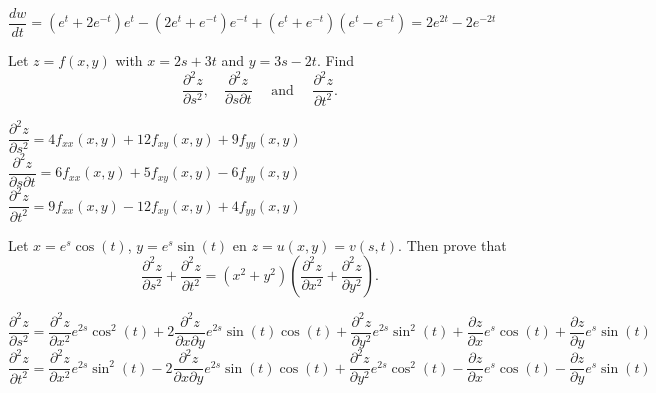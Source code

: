 \begin{Answer}
    $\dfrac{dw}{dt} = (e^t+2e^{-t})e^t - (2e^t+e^{-t})e^{-t} + (e^t+e^{-t})(e^t-e^{-t}) = 2e^{2t}-2e^{-2t}$
\end{Answer}
\fi

\ifanalysis\begin{Exercise}[difficulty = 2]\fi\ifcalculus\begin{Exercise}[difficulty = 3]\fi Let $z = f(x,y)$ with $x=2s+3t$ and $y=3s-2t$. Find $$\dfrac{\partial^2 z}{\partial s^2}, \quad \dfrac{\partial^2 z}{\partial s \partial t} \quad \text{ and } \quad \dfrac{\partial^2 z}{\partial t^2}.$$
\ifanalysis\end{Exercise}\fi\ifcalculus\end{Exercise}\fi

\begin{Answer}

    $\dfrac{\partial^2 z}{ \partial s^2}  = 4 f_{xx}(x,y) + 12 f_{xy}(x,y) + 9 f_{yy}(x,y) $
    \\ $\dfrac{\partial^2 z}{ \partial s \partial t} = 6 f_{xx}(x,y) + 5 f_{xy}(x,y) -6 f_{yy}(x,y)$ 
    \\ $\dfrac{\partial^2 z}{ \partial t^2}  = 9 f_{xx}(x,y) - 12 f_{xy}(x,y) + 4 f_{yy}(x,y) $
\end{Answer}

\ifanalysis
\begin{Exercise}[difficulty = 3]
Let $x=e^s \cos (t)$, $y=e^s \sin (t)$ en $z=u(x,y)=v(s,t)$. Then prove that
\[\dfrac{\partial^2 z}{\partial s^2} + \dfrac{\partial^2 z}{\partial t^2} = (x^2 + y^2) \left(  \dfrac{\partial^2 z}{\partial x^2} + \dfrac{\partial^2 z}{\partial y^2} \right). \]
\end{Exercise}

\begin{Answer}

    $\dfrac{\partial^2 z}{ \partial s^2}  = \dfrac{\partial^2 z}{ \partial x^2} e^{2s} \cos^2 (t) + 2 \dfrac{\partial^2 z}{ \partial x \partial y} e^{2s} \sin (t) \cos (t)+ \dfrac{\partial^2 z}{ \partial y^2} e^{2s} \sin^2 (t) + \dfrac{\partial z}{ \partial x} e^{s} \cos (t) + \dfrac{\partial z}{ \partial y} e^{s} \sin (t)$ \\[0.2cm]
     $\dfrac{\partial^2 z}{ \partial t^2}  = \dfrac{\partial^2 z}{ \partial x^2} e^{2s} \sin^2 (t) - 2 \dfrac{\partial^2 z}{ \partial x \partial y} e^{2s} \sin (t) \cos (t) + \dfrac{\partial^2 z}{ \partial y^2} e^{2s} \cos^2 (t) -\dfrac{\partial z}{ \partial x} e^{s} \cos (t) - \dfrac{\partial z}{ \partial y} e^{s} \sin (t)$
\end{Answer}

